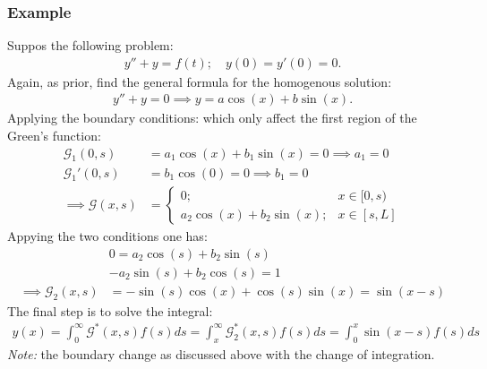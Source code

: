 \documentclass[12pt]{article}
\newcommand{\G}{\mathcal{G}}
\newcommand{\note}{\textit{Note: }}
\begin{document}
\subsubsection*{Example}
Suppos the following problem:
\begin{align*}
    y'' + y = f(t); \quad y(0) = y'(0) = 0.
\end{align*}Again, as prior, find the general formula for the homogenous solution:
\begin{align*}
    y'' + y = 0\implies y = a\cos(x) + b\sin(x).
\end{align*}Applying the boundary conditions: which only affect the first region of the Green's function:
\begin{align*}
    \G_1(0,s) &= a_1\cos(x) + b_1\sin(x) = 0\implies a_1 = 0\\
    \G_1'(0,s) &= b_1\cos(0) = 0\implies b_1 = 0\\
    \implies \G(x,s) &= \begin{cases}
        0;& x\in[0,s)\\
        a_2\cos(x) + b_2\sin(x);& x\in[s,L]
    \end{cases}
\end{align*}Appying the two conditions one has:
\begin{align*}
    &0 = a_2\cos(s) + b_2\sin(s)\\
    &-a_2\sin(s) + b_2\cos(s) = 1\\
    \implies \G_2(x,s) &= -\sin(s)\cos(x) + \cos(s)\sin(x) = \sin(x - s)
\end{align*}The final step is to solve the integral:
\begin{align*}
    y(x) = \int_0^\infty \G^*(x,s)f(s)ds = \int_x^\infty \G_2^*(x,s)f(s)ds = \int_0^x \sin(x-s)f(s)ds
\end{align*}\note the boundary change as discussed above with the change of integration.
\end{document}
